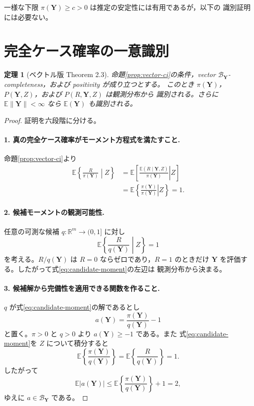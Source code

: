 \documentclass[11pt,a4paper]{article}
\newtheorem{theorem}{定理}
\newcommand{\E}{\mathbb E}
\newcommand{\1}{\mathbf 1}
\newcommand{\Y}{\bm Y}
\begin{document}
一様な下限 $\pi(\Y)\ge c>0$ は推定の安定性には有用であるが，以下の
識別証明には必要ない。

\section{完全ケース確率の一意識別}

\begin{theorem}[ベクトル版 Theorem 2.3]
\label{thm:vector-identification}
命題\ref{prop:vector-ci}の条件，vector
$\mathcal B_{\Y}$-completeness，および positivity が成り立つとする。
このとき $\pi(\Y)$，$P(\Y,Z)$，および $P(R,\Y,Z)$ は観測分布から
識別される。さらに $\E\|\Y\|<\infty$ なら $\E(\Y)$ も識別される。
\end{theorem}

\begin{proof}
証明を六段階に分ける。

\paragraph{1. 真の完全ケース確率がモーメント方程式を満たすこと.}
命題\ref{prop:vector-ci}より
\begin{align}
 \E\left\{\frac{R}{\pi(\Y)}\middle|Z\right\}
 &=\E\left[\left.
   \frac{\E(R\mid\Y,Z)}{\pi(\Y)}\right|Z\right]\\
 &=\E\left\{\left.
   \frac{\pi(\Y)}{\pi(\Y)}\right|Z\right\}=1.
 \label{eq:true-moment}
\end{align}

\paragraph{2. 候補モーメントの観測可能性.}
任意の可測な候補 $q:\mathbb R^m\to(0,1]$ に対し
\begin{equation}
 \E\left\{\frac{R}{q(\Y)}\middle|Z\right\}=1
 \label{eq:candidate-moment}
\end{equation}
を考える。$R/q(\Y)$ は $R=0$ ならゼロであり，$R=1$ のときだけ
$\Y$ を評価する。したがって式\eqref{eq:candidate-moment}の左辺は
観測分布から決まる。

\paragraph{3. 候補解から完備性を適用できる関数を作ること.}
$q$ が式\eqref{eq:candidate-moment}の解であるとし
\begin{equation}
 a(\Y)=\frac{\pi(\Y)}{q(\Y)}-1
 \label{eq:ratio-function}
\end{equation}
と置く。$\pi>0$ と $q>0$ より $a(\Y)\ge-1$ である。また
式\eqref{eq:candidate-moment}を $Z$ について積分すると
\begin{equation}
 \E\left\{\frac{\pi(\Y)}{q(\Y)}\right\}
 =\E\left\{\frac{R}{q(\Y)}\right\}=1.
\end{equation}
したがって
\begin{equation}
 \E|a(\Y)|
 \le \E\left\{\frac{\pi(\Y)}{q(\Y)}\right\}+1=2,
 \label{eq:ratio-integrability}
\end{equation}
ゆえに $a\in\mathcal B_{\Y}$ である。


\end{proof}
\end{document}
